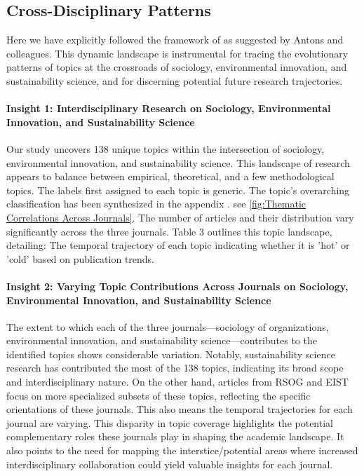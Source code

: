 \documentclass[12pt]{article}
\begin{document}
\subsection{Cross-Disciplinary Patterns}
Here we have explicitly followed the framework of \cite{griffiths_finding_2004} as suggested by Antons and colleagues. This dynamic landscape is instrumental for tracing the evolutionary patterns of topics at the crossroads of sociology, environmental innovation, and sustainability science, and for discerning potential future research trajectories.
\paragraph{Insight 1: Interdisciplinary Research on Sociology, Environmental Innovation, and Sustainability Science}
Our study uncovers 138 unique topics within the intersection of sociology, environmental innovation, and sustainability science. This landscape of research appears to balance between empirical, theoretical, and a few methodological topics.
The labels first assigned to each topic is generic. The topic's overarching classification has been synthesized in the appendix . see \ref{fig:Thematic Correlations Across Journals}.
The number of articles and their distribution vary significantly across the three journals. Table 3 outlines this topic landscape, detailing:
The temporal trajectory of each topic
indicating whether it is 'hot' or 'cold' based on publication trends.
\paragraph{Insight 2: Varying Topic Contributions Across Journals on Sociology, Environmental Innovation, and Sustainability Science}
The extent to which each of the three journals—sociology of organizations, environmental innovation, and sustainability science—contributes to the identified topics shows considerable variation. Notably, sustainability science research has contributed the most of the 138 topics, indicating its broad scope and interdisciplinary nature. On the other hand, articles from RSOG and EIST focus on more specialized subsets of these topics, reflecting the specific orientations of these journals. This also means the temporal trajectories for each journal are varying. This disparity in topic coverage highlights the potential complementary roles these journals play in shaping the academic landscape. It also points to the need for mapping the interstice/potential areas where increased interdisciplinary collaboration could yield valuable insights for each journal.
\end{document}
